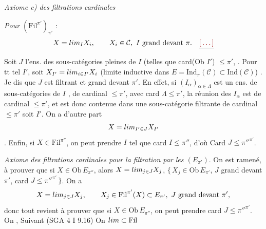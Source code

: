 \documentclass[11pt,a4paper]{article}
\begin{document}
\emph{Axiome c) des filtrations cardinales}

\emph{Pour $(\mathrm{Fil}^{\pi'})_{\pi'}$} :
\[
  X = \varinjlim_{I} X_{i}, \qquad X_{i} \in \mathcal{C},\ I \text{ grand
  devant } \pi. \quad \struck{\ill{}}
\]
Soit $J$ l'ens. des sous-catégories pleines  de $I$
 (telles que card(Ob $I'$) $\leqslant \pi'$,
 \struck{\ill{}}. Pour tt tel $I'$, soit
$X_{I'} = \varinjlim_{i \in I'} X_{i}$ (limite inductive dans $E =
\mathrm{Ind}_{\pi}(\mathcal{C}) \subset \mathrm{Ind}(\mathcal{C})$)
\struck{\ill{}}. Je dis que $J$ est filtrant et grand devant $\pi'$. En
effet, si $(I_{\alpha})_{\alpha \in \Lambda}$ est un ens. de
sous-catégories de $I$ , de cardinal $\leqslant
\pi'$, avec card $\Lambda \leqslant \pi'$, la réunion \add{\struck{\ill{}}} des
$I_{\alpha}$ est de cardinal $\leqslant \pi'$, et \struck{\ill{}} est donc
contenue dans une sous-catégorie filtrante de cardinal $\leqslant \pi'$
\struck{\ill{}} soit $I'$.  On a d'autre part
\[
  X = \varinjlim_{I' \in J} X_{I'}
\]
.
Enfin, si $X \in \mathrm{Fil}^{\pi''}$, on peut prendre $I$ tel que card $I
\leqslant \pi''$, d'où Card $J \leqslant \pi''^{\pi'}$.


\emph{Axiome des filtrations cardinales pour la filtration par les
$(E_{\pi'})$}. On est ramené, \struck{\ill{}} à prouver que si $X \in
\mathrm{Ob}\,E_{\pi''}$, alors $X = \varinjlim_{j \in J} X_{j}$,
$\{\,X_{j} \in \mathrm{Ob}\,E_{\pi'}$, $J$ grand devant $\pi'$, card $J
\leqslant \pi''^{\pi'}\,\}$.  On a
\[
  X = \varinjlim_{j \in J} X_{j}, \qquad X_{j} \in \mathrm{Fil}^{\pi'}(X)
  \subset E_{\pi'},\ J \text{ grand devant } \pi',
\]
donc tout revient à prouver que si $X \in \mathrm{Ob}\,E_{\pi''}$, on peut
prendre card $J \leqslant \pi''^{\pi'}$. On , Suivant (SGA 4 I 9.16) On \ill{} $\varinjlim \subset \mathrm{Fil}$
\end{document}
